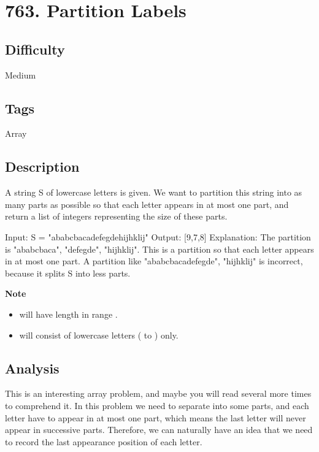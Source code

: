 \tocless\section{763. Partition Labels}
\label{algo:763}

\subsection*{Difficulty}
Medium

\subsection*{Tags}
Array

\subsection*{Description}
A string S of lowercase letters is given. We want to partition this string into as many parts as possible so that each letter appears in at most one part, and return a list of integers representing the size of these parts.

\begin{example}
\begin{multilinecode}
Input: S = "ababcbacadefegdehijhklij"
Output: [9,7,8]
Explanation:
The partition is "ababcbaca", "defegde", "hijhklij".
This is a partition so that each letter appears in at most one part.
A partition like "ababcbacadefegde", "hijhklij" is incorrect, because it splits S into less parts.
\end{multilinecode}
\end{example}

\textbf{Note}
\begin{itemize}
    \item {} will have length in range \inlinecode{[1, 500]}.
    \item {} will consist of lowercase letters ( to ) only.
\end{itemize}

\subsection*{Analysis}
This is an interesting array problem, and maybe you will read several more times to comprehend it. In this problem we need to separate  into some parts, and each letter have to appear in at most one part, which means the last letter will never appear in successive parts. Therefore, we can naturally have an idea that we need to record the last appearance position of each letter.

